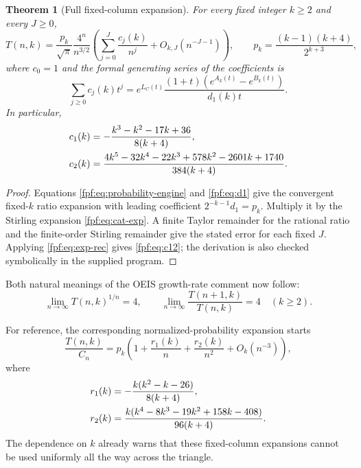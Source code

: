 \documentclass[11pt]{article}
\numberwithin{equation}{section}
\newtheorem{theorem}{Theorem}[section]
\theoremstyle{definition}
\begin{document}
\begin{theorem}[Full fixed-column expansion]\label{fpf:thm:fixed-all}
For every fixed integer $k\ge2$ and every $J\ge0$,
\begin{equation}\label{fpf:eq:all-orders}
 T(n,k)=\frac{p_k}{\sqrt\pi}\frac{4^n}{n^{3/2}}
 \left(\sum_{j=0}^J\frac{c_j(k)}{n^j}+O_{k,J}(n^{-J-1})\right),
 \qquad p_k=\frac{(k-1)(k+4)}{2^{k+3}},
\end{equation}
where $c_0=1$ and the formal generating series of the coefficients is
\begin{equation}\label{fpf:eq:all-engine}
 \sum_{j\ge0}c_j(k)t^j
 =e^{L_C(t)}\frac{(1+t)(e^{A_k(t)}-e^{B_k(t)})}{d_1(k)t}.
\end{equation}
In particular,
\begin{align}\label{fpf:eq:c12}
 c_1(k)&=-\frac{k^3-k^2-17k+36}{8(k+4)},\notag\\
 c_2(k)&=\frac{4k^5-32k^4-22k^3+578k^2-2601k+1740}{384(k+4)}.
\end{align}
\end{theorem}
\begin{proof}
Equations \eqref{fpf:eq:probability-engine} and \eqref{fpf:eq:d1} give the convergent
fixed-$k$ ratio expansion with leading coefficient
$2^{-k-1}d_1=p_k$. Multiply it by the Stirling expansion
\eqref{fpf:eq:cat-exp}. A finite Taylor remainder for the rational ratio and
the finite-order Stirling remainder give the stated error for each fixed
$J$. Applying \eqref{fpf:eq:exp-rec} gives \eqref{fpf:eq:c12}; the derivation is
also checked symbolically in the supplied program.
\end{proof}
Both natural meanings of the OEIS growth-rate comment now follow:
\begin{equation}\label{fpf:eq:growth}
 \lim_{n\to\infty}T(n,k)^{1/n}=4,
 \qquad \lim_{n\to\infty}\frac{T(n+1,k)}{T(n,k)}=4
 \quad(k\ge2).
\end{equation}

For reference, the corresponding normalized-probability expansion starts
\begin{equation}\label{fpf:eq:prob-corr}
 \frac{T(n,k)}{C_n}
 =p_k\left(1+\frac{r_1(k)}n+\frac{r_2(k)}{n^2}+O_k(n^{-3})\right),
\end{equation}
where
\begin{align}\label{fpf:eq:r12}
 r_1(k)&=-\frac{k(k^2-k-26)}{8(k+4)},\notag\\
 r_2(k)&=\frac{k(k^4-8k^3-19k^2+158k-408)}{96(k+4)}.
\end{align}
The dependence on $k$ already warns that these fixed-column expansions
cannot be used uniformly all the way across the triangle.
\end{document}
